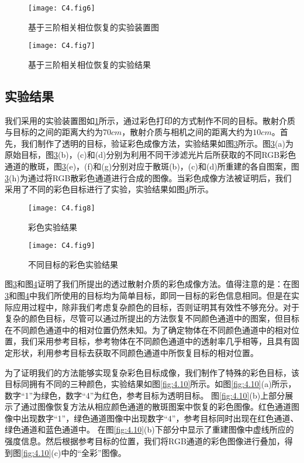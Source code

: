 \begin{figure}[htp]
	\centering
	\texttt{[image: C4.fig6]}
	\caption{基于三阶相关相位恢复的实验装置图}
	\label{fig:4.6}
\end{figure}
\begin{figure}[htp]
	\centering
	\texttt{[image: C4.fig7]}
	\caption{基于三阶相关相位恢复的实验结果}
	\label{fig:4.7}
\end{figure}

\subsection{实验结果}

我们采用的实验装置图如\ref{fig:4.6}所示，通过彩色打印的方式制作不同的目标。散射介质与目标的之间的距离大约为$70cm$，散射介质与相机之间的距离大约为$10cm$。首先，我们制作了透明的目标，验证彩色成像方法，实验结果如图\ref{fig:4.8}所示。图\ref{fig:4.8}(a)为原始目标，图\ref{fig:4.8}(b)，(c)和(d)分别为利用不同干涉滤光片后所获取的不同RGB彩色通道的散斑，图\ref{fig:4.8}(e)，(f)和(g)分别对应于散斑(b)，(c)和(d)所重建的各自图案，图\ref{fig:4.8}(h)为通过将RGB散彩色通道进行合成的图像。当彩色成像方法被证明后，我们采用了不同的彩色目标进行了实验，实验结果如图\ref{fig:4.9}所示。

\begin{figure}[htp]
	\centering
	\texttt{[image: C4.fig8]}
	\caption{彩色实验结果}
	\label{fig:4.8}
\end{figure}
\begin{figure}[htp]
	\centering
	\texttt{[image: C4.fig9]}
	\caption{不同目标的彩色实验结果}
	\label{fig:4.9}
\end{figure}

图\ref{fig:4.8}和图\ref{fig:4.9}证明了我们所提出的透过散射介质的彩色成像方法。值得注意的是：在图\ref{fig:4.8}和图\ref{fig:4.9}中我们所使用的目标均为简单目标，即同一目标的彩色信息相同。但是在实际应用过程中，除非我们考虑复杂颜色的目标，否则证明其有效性不够充分。对于复杂的颜色目标，尽管可以通过所提出的方法恢复不同颜色通道中的图案，但目标在不同颜色通道中的相对位置仍然未知。为了确定物体在不同颜色通道中的相对位置，我们采用参考目标，参考物体在不同颜色通道中的透射率几乎相等，且具有固定形状，利用参考目标去获取不同颜色通道中所恢复目标的相对位置。

为了证明我们的方法能够实现复杂彩色目标成像，我们制作了特殊的彩色目标，该目标同拥有不同的三种颜色，实验结果如图\ref{fig:4.10}所示。如图\ref{fig:4.10}(a)所示，数字“1”为绿色，数字“4”为红色，参考目标为透明目标。 图\ref{fig:4.10}(b)上部分展示了通过图像恢复方法从相应颜色通道的散斑图案中恢复的彩色图像。红色通道图像中出现数字“1”，绿色通道图像中出现数字“4”，参考目标同时出现在红色通道、绿色通道和蓝色通道中。 在图\ref{fig:4.10}(b)下部分中显示了重建图像中虚线所应的强度信息。然后根据参考目标的位置，我们将RGB通道的彩色图像进行叠加，得到图\ref{fig:4.10}(c)中的“全彩”图像。

